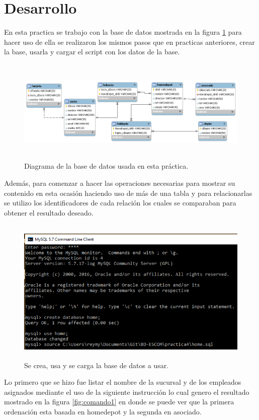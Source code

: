 \documentclass[12pt, titlepage]{article}
\begin{document}
\section{Desarrollo}
En esta practica se trabajo con la base de datos mostrada en la figura \ref{fig:home} para hacer uso de ella se realizaron los mismos pasos que en practicas anteriores, crear la base, usarla y cargar el script con los datos de la base.
 \begin{figure}[H]
	\begin{center}
		\includegraphics[width=15cm, height=5cm]{img/home.png}
		\caption{Diagrama de la base de datos usada en esta práctica.}
		\label{fig:home}
	\end{center}
\end{figure}
Además, para comenzar a hacer las operaciones necesarias para mostrar su contenido en esta ocasión haciendo uso de más de una tabla y para relacionarlas se utilizo los identificadores de cada relación los cuales se comparaban para obtener el resultado deseado.
 \begin{figure}[H]
	\begin{center}
		\includegraphics[width=15cm, height=7cm]{img/crear.png}
		\caption{Se crea, usa y se carga la base de datos a usar.}
		\label{fig:home1}
	\end{center}
\end{figure}
Lo primero que se hizo fue listar el nombre de la sucursal y de los empleados asignados mediante el uso de la siguiente instrucción lo cual genero el resultado mostrado en la figura \ref{fig:comando1} en donde se puede ver que la primera ordenación esta basada en homedepot y la segunda en asociado.
\end{document}
